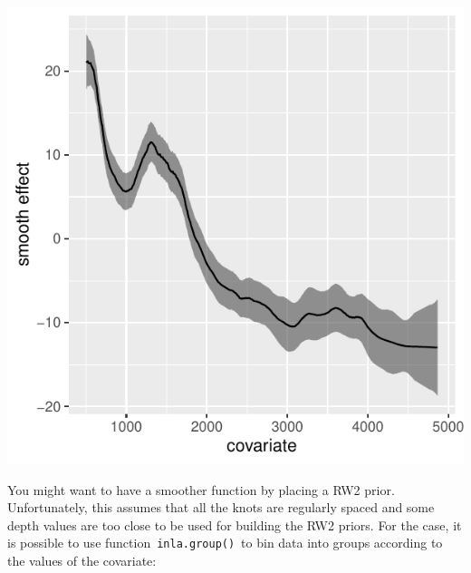\documentclass[
  letterpaper,
  DIV=11,
  numbers=noendperiod]{scrartcl}
\newenvironment{Shaded}{\begin{snugshade}}{\end{snugshade}}
\newcommand{\AttributeTok}[1]{\textcolor[rgb]{0.40,0.45,0.13}{#1}}
\newcommand{\DecValTok}[1]{\textcolor[rgb]{0.68,0.00,0.00}{#1}}
\newcommand{\FunctionTok}[1]{\textcolor[rgb]{0.28,0.35,0.67}{#1}}
\newcommand{\NormalTok}[1]{\textcolor[rgb]{0.00,0.23,0.31}{#1}}
\newcommand{\OtherTok}[1]{\textcolor[rgb]{0.00,0.23,0.31}{#1}}
\newcommand{\SpecialCharTok}[1]{\textcolor[rgb]{0.37,0.37,0.37}{#1}}
\begin{document}
\begin{center}
\includegraphics{day1_practical_2_files/figure-pdf/unnamed-chunk-40-1.pdf}
\end{center}

You might want to have a smoother function by placing a RW2 prior.
Unfortunately, this assumes that all the knots are regularly spaced and
some depth values are too close to be used for building the RW2 priors.
For the case, it is possible to use function~\texttt{inla.group()}~to
bin data into groups according to the values of the covariate:

\begin{Shaded}
\end{Shaded}
\end{document}
